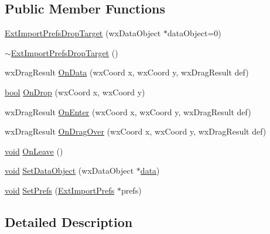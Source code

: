 \subsection*{Public Member Functions}
\begin{DoxyCompactItemize}
\item 
\hyperlink{class_ext_import_prefs_drop_target_a223dd99a360d4d0eb927ea8d4b1627db}{Ext\+Import\+Prefs\+Drop\+Target} (wx\+Data\+Object $\ast$data\+Object=0)
\item 
\hyperlink{class_ext_import_prefs_drop_target_a5fced6ce8cff6fac9bf65dfe940b1880}{$\sim$\+Ext\+Import\+Prefs\+Drop\+Target} ()
\item 
wx\+Drag\+Result \hyperlink{class_ext_import_prefs_drop_target_a43ea823ecd4d096031e697cfac837960}{On\+Data} (wx\+Coord x, wx\+Coord y, wx\+Drag\+Result def)
\item 
\hyperlink{mac_2config_2i386_2lib-src_2libsoxr_2soxr-config_8h_abb452686968e48b67397da5f97445f5b}{bool} \hyperlink{class_ext_import_prefs_drop_target_ae19f0757a2379b78f54bde37ce51f4eb}{On\+Drop} (wx\+Coord x, wx\+Coord y)
\item 
wx\+Drag\+Result \hyperlink{class_ext_import_prefs_drop_target_a7fc78861127f4f0a7b089a9fc473f077}{On\+Enter} (wx\+Coord x, wx\+Coord y, wx\+Drag\+Result def)
\item 
wx\+Drag\+Result \hyperlink{class_ext_import_prefs_drop_target_acdc3814f273c3820bb570e4b60b902a3}{On\+Drag\+Over} (wx\+Coord x, wx\+Coord y, wx\+Drag\+Result def)
\item 
\hyperlink{sound_8c_ae35f5844602719cf66324f4de2a658b3}{void} \hyperlink{class_ext_import_prefs_drop_target_ad65dee0f1137afe81ae70ccaed9e266f}{On\+Leave} ()
\item 
\hyperlink{sound_8c_ae35f5844602719cf66324f4de2a658b3}{void} \hyperlink{class_ext_import_prefs_drop_target_a2e7fd5b3094082abfe3c78211498670b}{Set\+Data\+Object} (wx\+Data\+Object $\ast$\hyperlink{lib_2expat_8h_ac39e72a1de1cb50dbdc54b08d0432a24}{data})
\item 
\hyperlink{sound_8c_ae35f5844602719cf66324f4de2a658b3}{void} \hyperlink{class_ext_import_prefs_drop_target_a3b0de3bf2cd915314a71fbaf1d1f6f5f}{Set\+Prefs} (\hyperlink{class_ext_import_prefs}{Ext\+Import\+Prefs} $\ast$prefs)
\end{DoxyCompactItemize}


\subsection{Detailed Description}


